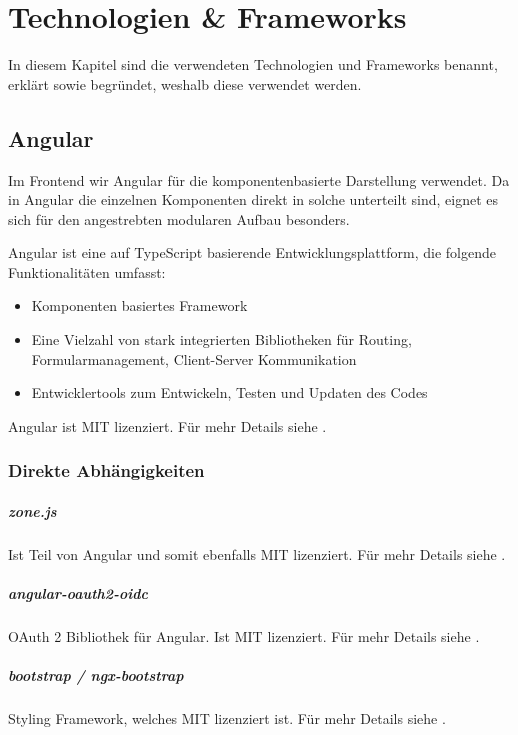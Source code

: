 \chapter{Technologien & Frameworks}\label{ch:technologien-&-frameworks}

In diesem Kapitel sind die verwendeten Technologien und Frameworks benannt, erklärt
sowie begründet, weshalb diese verwendet werden.

\section{Angular}\label{sec:angular}

Im Frontend wir Angular für die komponentenbasierte Darstellung verwendet.
Da in Angular die einzelnen Komponenten direkt in solche unterteilt sind,
eignet es sich für den angestrebten modularen Aufbau besonders.

Angular ist eine auf \gls{TypeScript} basierende Entwicklungsplattform, die folgende Funktionalitäten umfasst:
\begin{itemize}
    \item Komponenten basiertes Framework
    \item Eine Vielzahl von stark integrierten Bibliotheken für Routing, Formularmanagement, Client-Server Kommunikation
    \item Entwicklertools zum Entwickeln, Testen und Updaten des Codes
\end{itemize}
\cite{about-angular}

Angular ist MIT lizenziert.
Für mehr Details siehe .

\subsection{Direkte Abhängigkeiten}

\paragraph{zone.js}
Ist Teil von Angular und somit ebenfalls MIT lizenziert.
Für mehr Details siehe .

\paragraph{angular-oauth2-oidc}
OAuth 2 Bibliothek für Angular.
Ist MIT lizenziert.
Für mehr Details siehe .

\paragraph{bootstrap / ngx-bootstrap}
Styling Framework, welches MIT lizenziert ist.
Für mehr Details siehe .


